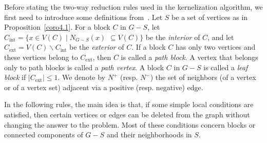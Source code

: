 \documentclass[
final
]{dmtcs-episciences}
\begin{document}
Before stating the two-way reduction rules used in the kernelization algorithm, we first need to introduce some definitions from~\cite{crowston2013maximum}. Let $S$ be a set of vertices as in Proposition~\ref{coro4.1}. For a block $C$ in $G-S$, let $C_{\text{int}}=\{x\in V(C)  \mid N_{G-S}(x)$ $\subseteq V(C)\}$ be the {\it{interior}} of $C$, and let $C_{\text{ext}}=V(C)\backslash C_{\text{int}}$ be the {\it{exterior}} of $C$.
If a block $C$ has only two vertices and these vertices belong to $C_{\text{ext}}$, then $C$ is called a {\it{path block}}. A vertex that belongs only to path blocks is called a {\it{path vertex}}. A block $C$ in $G-S$ is called a {\it{leaf block}} if $|C_{\text{ext}}|\leq 1$. We denote by $N^+$ (resp. $N^-$) the set of neighbors (of a vertex or of a vertex set) adjacent via a positive (resp. negative) edge.



In the following rules, the main idea is that, if some simple local conditions are satisfied, then certain vertices or edges can be deleted from the graph without changing the answer to the problem. Most of these conditions concern blocks or connected components of $G-S$ and their neighborhoods in $S$.

\vspace{.3cm}


\vspace{.3cm}


\vspace{.3cm}
	
\end{document}
